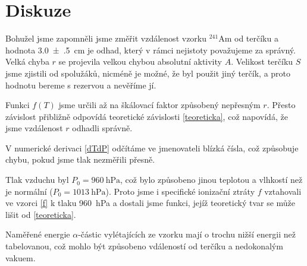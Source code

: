 \section*{Diskuze}
Bohužel jsme zapomněli jsme změřit vzdálenost vzorku $^{241}$Am od terčíku a hodnota \SI{3.0(5)}{\cm} je odhad, který v rámci nejistoty považujeme za správný. Velká chyba $r$ se projevila velkou chybou absolutní aktivity $A$. Velikost terčíku $S$ jsme zjistili od spolužáků, nicméně je možné, že byl použit jiný terčík, a proto hodnotu bereme s rezervou a nevěříme jí.



Funkci $f(T)$ jsme určili až na škálovací faktor způsobený nepřesným $r$. Přesto závislost přibližně odpovídá teoretické závislosti \eqref{teoreticka}, což napovídá, že jsme vzdálenost $r$ odhadli správně.

V numerické derivaci \eqref{dTdP} odčítáme ve jmenovateli blízká čísla, což způsobuje chybu, pokud jsme tlak nezměřili přesně.

Tlak vzduchu byl $P_0=\SI{960}{\hecto\pascal}$, což bylo způsobeno jinou teplotou a vlhkostí než je normální ($P_0=\SI{1013}{\hecto\pascal}$). Proto jsme i specifické ionizační ztráty $f$ vztahovali ve vzorci \ref{f} k tlaku \SI{960}{\hecto\pascal} a dostali jsme funkci, jejíž teoretický tvar se může lišit od \eqref{teoreticka}.



Naměřené energie $\alpha$-částic vylétajících ze vzorku mají o trochu nižší energii než tabelovanou, což mohlo být způsobeno vdáleností od terčíku a nedokonalým vakuem.
